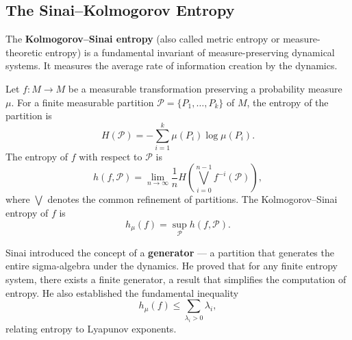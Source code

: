 \subsection{The Sinai--Kolmogorov Entropy}

The \textbf{Kolmogorov--Sinai entropy} (also called metric entropy or measure-theoretic entropy) is a fundamental invariant of measure-preserving dynamical systems. It measures the average rate of information creation by the dynamics.

\begin{definition}
Let \(f: M \to M\) be a measurable transformation preserving a probability measure \(\mu\). For a finite measurable partition \(\mathcal{P} = \{P_1, \dots, P_k\}\) of \(M\), the entropy of the partition is
\[
H(\mathcal{P}) = -\sum_{i=1}^k \mu(P_i) \log \mu(P_i).
\]
The entropy of \(f\) with respect to \(\mathcal{P}\) is
\[
h(f, \mathcal{P}) = \lim_{n \to \infty} \frac{1}{n} H\left(\bigvee_{i=0}^{n-1} f^{-i}(\mathcal{P})\right),
\]
where \(\bigvee\) denotes the common refinement of partitions. The Kolmogorov--Sinai entropy of \(f\) is
\[
h_\mu(f) = \sup_{\mathcal{P}} h(f, \mathcal{P}).
\]\end{definition}

Sinai introduced the concept of a \textbf{generator} --- a partition that generates the entire sigma-algebra under the dynamics. He proved that for any finite entropy system, there exists a finite generator, a result that simplifies the computation of entropy. He also established the fundamental inequality
\[
h_\mu(f) \le \sum_{\lambda_i > 0} \lambda_i,
\]
relating entropy to Lyapunov exponents.

